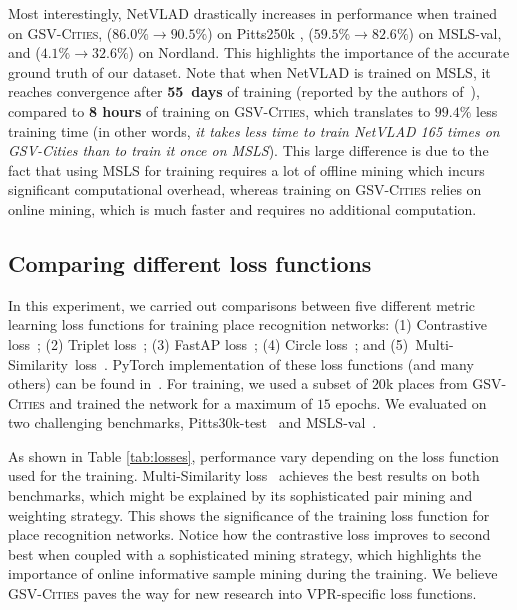 \documentclass{article}
\begin{document}
Most interestingly, NetVLAD drastically increases in performance when trained on \textsc{GSV-Cities}, ($86.0\% \rightarrow 90.5\%$) on Pitts250k , ($59.5\% \rightarrow 82.6\%$) on MSLS-val, and ($4.1\% \rightarrow 32.6\%$) on Nordland. This highlights the importance of the accurate ground truth of our dataset.
Note that when NetVLAD is trained on MSLS, it reaches convergence after \mbox{\textbf{55 days}} of training (reported by the authors of~\cite{hausler2021patch}), compared to \textbf{8 hours} of training on \textsc{GSV-Cities}, which translates to $99.4\%$ less training time (in other words, \textit{it takes less time to train NetVLAD 165 times on \textit{GSV-Cities} than to train it once on MSLS}). This large difference is due to the fact that using MSLS for training requires a lot of offline mining which incurs significant computational overhead, whereas training on \textsc{GSV-Cities} relies on online mining, which is much faster and requires no additional computation.

\subsection{Comparing different loss functions}
\label{sec:exp:metric_learning}
In this experiment, we carried out comparisons between five different metric learning loss functions for training place recognition networks: (1) Contrastive loss~\cite{hadsell2006dimensionality}; (2) Triplet loss~\cite{hermans2017defense}; (3) FastAP loss~\cite{cakir2019deep}; (4) Circle loss~\cite{sun2020circle}; and \mbox{(5) Multi-Similarity loss~\cite{wang2019multi}}. PyTorch implementation of these loss functions (and many others) can be found in~\cite{musgrave2020pytorch}. 
For training, we used a subset of $20$k places from \textsc{GSV-Cities} and trained the network for a maximum of $15$ epochs. We evaluated on two challenging benchmarks, Pitts30k-test~\cite{torii2013visual} and MSLS-val~\cite{warburg2020mapillary}.

As shown in Table \ref{tab:losses}, performance vary depending on the loss function used for the training. Multi-Similarity loss~\cite{wang2019multi} achieves the best results on both benchmarks, which might be explained by its sophisticated pair mining and weighting strategy. This shows the significance of the training loss function for place recognition networks. Notice how the contrastive loss improves to second best when coupled with a sophisticated mining strategy, which highlights the importance of online informative sample mining during the training. We believe \textsc{GSV-Cities} paves the way for new research into VPR-specific loss functions.
\end{document}
